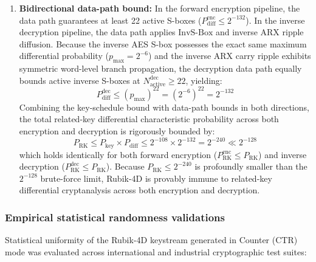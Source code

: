 \documentclass[10pt,twocolumn]{article}
\begin{document}
\begin{enumerate}
    \item \textbf{Bidirectional data-path bound:} In the forward encryption pipeline, the data path guarantees at least 22 active S-boxes ($P_{\text{diff}}^{\text{enc}} \le 2^{-132}$). In the inverse decryption pipeline, the data path applies $\text{InvS-Box}$ and inverse ARX ripple diffusion. Because the inverse AES S-box possesses the exact same maximum differential probability ($p_{\max} = 2^{-6}$) and the inverse ARX carry ripple exhibits symmetric word-level branch propagation, the decryption data path equally bounds active inverse S-boxes at $N_{\text{active}}^{\text{dec}} \ge 22$, yielding:
    \begin{equation}
        P_{\text{diff}}^{\text{dec}} \le (p_{\max})^{22} = (2^{-6})^{22} = 2^{-132}
    \end{equation}
    Combining the key-schedule bound with data-path bounds in both directions, the total related-key differential characteristic probability across both encryption and decryption is rigorously bounded by:
    \begin{equation}
        P_{\text{RK}} \le P_{\text{key}} \times P_{\text{diff}} \le 2^{-108} \times 2^{-132} = 2^{-240} \ll 2^{-128}
    \end{equation}
    which holds identically for both forward encryption ($P_{\text{RK}}^{\text{enc}} \le P_{\text{RK}}$) and inverse decryption ($P_{\text{RK}}^{\text{dec}} \le P_{\text{RK}}$). Because $P_{\text{RK}} \le 2^{-240}$ is profoundly smaller than the $2^{-128}$ brute-force limit, Rubik-4D is provably immune to related-key differential cryptanalysis across both encryption and decryption.
\end{enumerate}

\subsubsection{Empirical statistical randomness validations}
Statistical uniformity of the Rubik-4D keystream generated in Counter (CTR) mode was evaluated across international and industrial cryptographic test suites:
\end{document}
